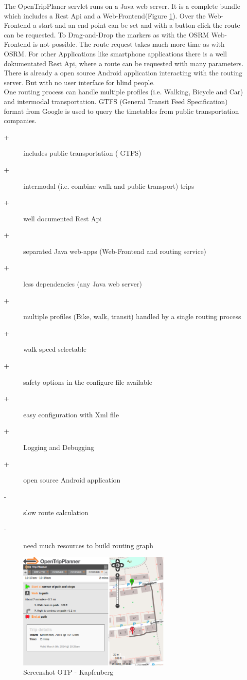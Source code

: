 \documentclass{sig-alternate}
\begin{document}
The OpenTripPlaner servlet runs on a Java web server. It is a complete bundle which includes a Rest Api and a Web-Frontend(Figure \ref{fig:otp}). Over  the Web-Frontend a start and an end point can be set and with a button click the route can be requested. To Drag-and-Drop the markers as with the OSRM Web-Frontend is not possible. The route request takes much more time as with OSRM. For other Applications like smartphone applications there is a well dokumentated Rest Api, where a route can be requested with many parameters. There is already a open source Android application interacting with the routing server. But with no user interface for blind people. \\
One routing process can handle multiple profiles (i.e. Walking, Bicycle and Car) and intermodal transportation. GTFS (General Transit Feed Specification) format from Google is used to query the timetables from public transportation companies. 

\begin{description}
  \item[+] includes public transportation ( GTFS)
  \item[+] intermodal (i.e. combine walk and public transport) trips
  \item[+] well documented Rest Api
  \item[+] separated Java web-apps (Web-Frontend and routing service)
  \item[+] less dependencies (any Java web server)
  \item[+] multiple profiles (Bike, walk, transit) handled by a single routing process
  \item[+] walk speed selectable
  \item[+] safety options in the configure file available
  \item[+] easy configuration with Xml file
  \item[+] Logging and Debugging 
  \item[+] open source Android application
  \item[-] slow route calculation
  \item[-] need much resources to build routing graph   
\end{description} 
 
\begin{figure}
\centering
\includegraphics[width=3in]{otp-ss.png}
\caption{Screenshot OTP - Kapfenberg}
\label{fig:otp}
\end{figure}
 
\end{document}
